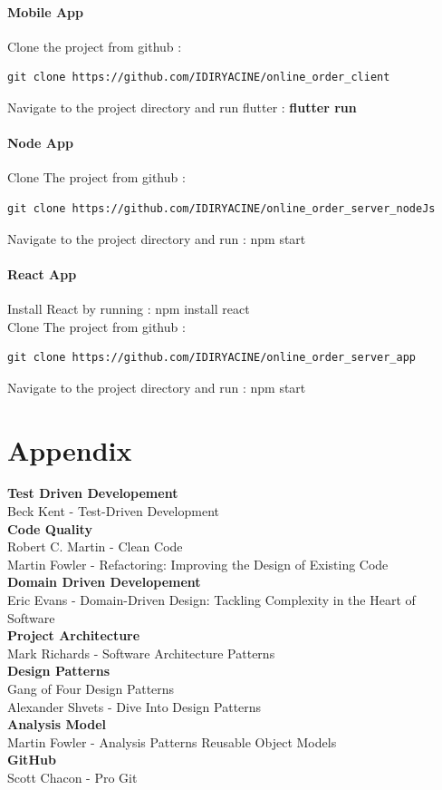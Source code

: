 \documentclass{article}
\begin{document}
\subsection{Mobile App}
Clone the project from github :
\begin{verbatim}
git clone https://github.com/IDIRYACINE/online_order_client
\end{verbatim}
Navigate to the project directory and run flutter : \textbf{flutter run} 
\subsection{Node App}
Clone The project from github :
\begin{verbatim}
git clone https://github.com/IDIRYACINE/online_order_server_nodeJs
\end{verbatim}
Navigate to the project directory and run : npm start 
\subsection{React App}
Install React by running : npm install react \\
Clone The project from github : 
\begin{verbatim}
git clone https://github.com/IDIRYACINE/online_order_server_app
\end{verbatim}
Navigate to the project directory and run : npm start 



\newpage
\part{Appendix}
\textbf{Test Driven Developement}\\
Beck Kent - Test-Driven Development\\
\textbf{Code Quality}\\
Robert C. Martin - Clean Code\\
Martin Fowler - Refactoring: Improving the Design of Existing Code\\
\textbf{Domain Driven Developement}\\
Eric Evans - Domain-Driven Design: Tackling Complexity in the Heart of Software\\
\textbf{Project Architecture}\\
Mark Richards - Software Architecture Patterns\\
\textbf{Design Patterns}\\
Gang of Four Design Patterns\\
Alexander Shvets - Dive Into Design Patterns\\
\textbf{Analysis Model}\\
Martin Fowler - Analysis Patterns Reusable Object Models\\
\textbf{GitHub}\\
Scott Chacon - Pro Git\\
\end{document}
